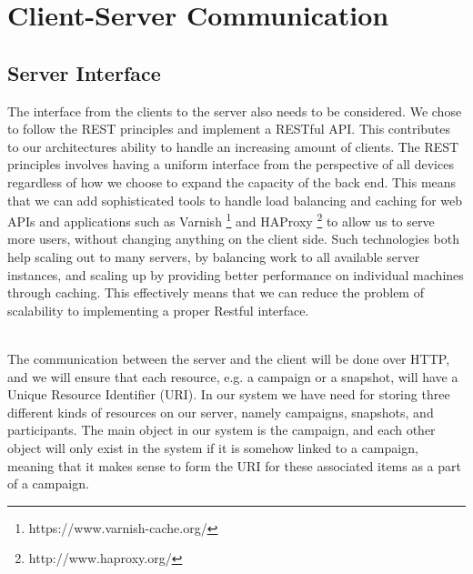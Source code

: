 \section{Client-Server Communication}
\label{sec:client_server_interface}

\subsection{Server Interface}
\label{sub:server_interface}
The interface from the clients to the server also needs to be considered. We chose to follow the REST principles  and implement a RESTful API. This contributes to our architectures ability to handle an increasing amount of clients. The REST principles involves having a uniform interface from the perspective of all devices regardless of how we choose to expand the capacity of the back end. This means that we can add sophisticated tools to handle load balancing and caching for web APIs and applications such as Varnish \footnote{https://www.varnish-cache.org/} and HAProxy \footnote{http://www.haproxy.org/} to allow us to serve more users, without changing anything on the client side. Such technologies both help scaling out to many servers, by balancing work to all available server instances, and scaling up by providing better performance on individual machines through caching. This effectively means that we can reduce the problem of scalability to implementing a proper Restful interface. 
\\\\

The communication between the server and the client will be done over HTTP, and we will ensure that each resource, e.g. a campaign or a snapshot, will have a Unique Resource Identifier (URI). In our system we have need for storing three different kinds of resources on our server, namely campaigns, snapshots, and participants. The main object in our system is the campaign, and each other object will only exist in the system if it is somehow linked to a campaign, meaning that it makes sense to form the URI for these associated items as a part of a campaign. 

